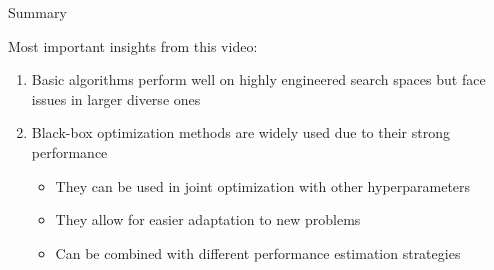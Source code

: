 \documentclass[main]{subfiles}
\begin{document}
\begin{frame}{Summary} 

Most important insights from this video:

\begin{enumerate}
    \item Basic algorithms perform well on highly engineered search spaces but face issues in larger diverse ones
    \item Black-box optimization methods are widely used due to their strong performance
    \begin{itemize}
        \item They can be used in joint optimization with other hyperparameters
        \item They allow for easier adaptation to new problems
        \item Can be combined with different performance estimation strategies
    \end{itemize}
\end{enumerate}



\end{frame}
\end{document}

